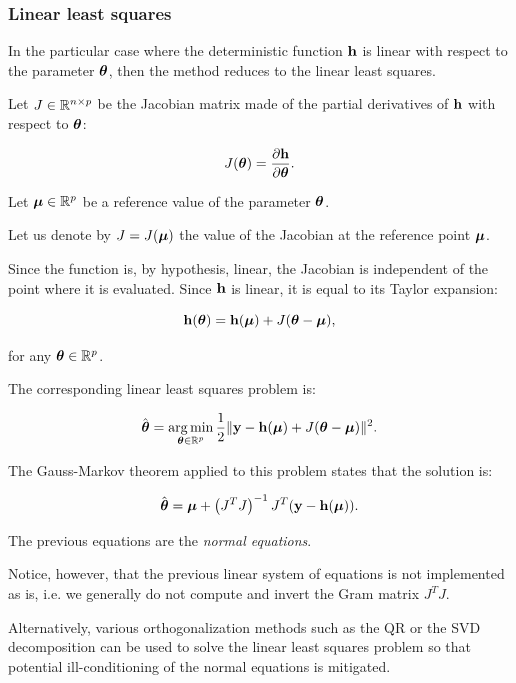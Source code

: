 \documentclass{beamer}
\begin{document}
\begin{frame}
\frametitle{Linear least squares}

In the particular case where the deterministic function ${\bf h}$
is linear with respect to the parameter $\boldsymbol{\theta}$, then the
method reduces to the linear least squares. 

Let $J \in \mathbb{R}^{n \times p}$ be the Jacobian matrix made of the
partial derivatives of ${\bf h}$ with respect to
$\boldsymbol{\theta}$:

$$
J(\boldsymbol{\theta}) = \frac{\partial {\bf h}}{\partial \boldsymbol{\theta}}.
$$

\end{frame}


\begin{frame}
Let $\boldsymbol{\mu} \in \mathbb{R}^p$ be a reference value of the
parameter $\boldsymbol{\theta}$. 

Let us denote by $J=J(\boldsymbol{\mu})$ the value of the Jacobian at the reference point
$\boldsymbol{\mu}$. 

Since the function is, by hypothesis, linear, the
Jacobian is independent of the point where it is evaluated. Since
${\bf h}$ is linear, it is equal to its Taylor expansion:

$$
       {\bf h}(\boldsymbol{\theta}) = {\bf h}(\boldsymbol{\mu}) + J (\boldsymbol{\theta} - \boldsymbol{\mu}),
$$

for any $\boldsymbol{\theta} \in \mathbb{R}^p$.

\end{frame}


\begin{frame}
The corresponding linear least squares problem is:

$$
       \hat{\boldsymbol{\theta}} = \operatorname*{arg\,min}_{\boldsymbol{\theta} \in \mathbb{R}^p} \frac{1}{2} \|{\bf y} - {\bf h}(\boldsymbol{\mu}) + J (\boldsymbol{\theta} - \boldsymbol{\mu})\|^2.
$$

The Gauss-Markov theorem applied to this problem states that the
solution is:

$$
       \hat{\boldsymbol{\theta}} = \boldsymbol{\mu} + \left(J^T J\right)^{-1} J^T ( {\bf y} - {\bf h}(\boldsymbol{\mu})).
$$

\end{frame}


\begin{frame}
The previous equations are the \emph{normal equations}. 

Notice, however, that the previous linear system of equations 
is not implemented as is, i.e.
we generally do not compute and invert the Gram matrix $J^T J$.

Alternatively, various orthogonalization methods such as the QR or the
SVD decomposition can be used to solve the linear least squares problem
so that potential ill-conditioning of the normal equations is
mitigated.

\end{frame}
\end{document}
